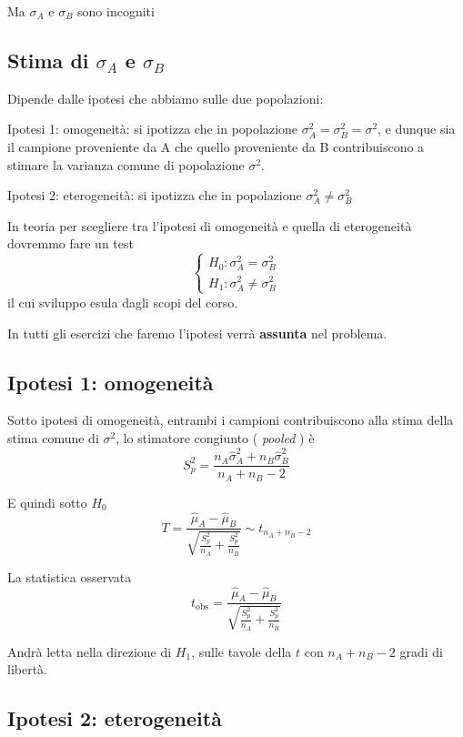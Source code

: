 \documentclass[
  11pt,
]{book}
\theoremstyle{mytheoremstyle}
\theoremstyle{mydefstyle}
\begin{document}
Ma \(\sigma_A\) e \(\sigma_B\) sono incogniti

\subsection{\texorpdfstring{Stima di \(\sigma_A\) e \(\sigma_B\)}{Stima di \textbackslash sigma\_A e \textbackslash sigma\_B}}\label{stima-di-sigma_a-e-sigma_b}

Dipende dalle ipotesi che abbiamo sulle due popolazioni:

Ipotesi 1: omogeneità: si ipotizza che in popolazione \(\sigma_A^2=\sigma_B^2=\sigma^2\), e dunque sia il campione proveniente da A che quello proveniente da B contribuiscono a stimare la varianza comune di popolazione \(\sigma^2\).

Ipotesi 2: eterogeneità: si ipotizza che in popolazione \(\sigma_A^2\neq\sigma_B^2\)

In teoria per scegliere tra l'ipotesi di omogeneità e quella di eterogeneità dovremmo fare un test
\[\begin{cases}
H_0:\sigma^2_A=\sigma^2_B\\
H_1:\sigma^2_A\neq\sigma^2_B
\end{cases}\]
il cui sviluppo esula dagli scopi del corso.

In tutti gli esercizi che faremo l'ipotesi verrà \textbf{assunta} nel problema.

\subsection{Ipotesi 1: omogeneità}\label{ipotesi-1-omogeneituxe0}

Sotto ipotesi di omogeneità, entrambi i campioni contribuiscono alla stima della stima comune di \(\sigma^2\), lo stimatore congiunto ( \emph{pooled} ) è
\[S^2_p=\frac{n_A\hat\sigma_A^2+n_B\hat\sigma_B^2}{n_A+n_B-2}\]

E quindi sotto \(H_0\)
\[T=\frac{\hat\mu_A-\hat\mu_B}{\sqrt{\frac{S_p^2}{n_A}+\frac{S_p^2}{n_B}}}\sim t_{n_A+n_B-2}\]

La statistica osservata
\[t_{\text{obs}}=\frac{\hat\mu_A-\hat\mu_B}{\sqrt{\frac{S_p^2}{n_A}+\frac{S_p^2}{n_B}}}\]

Andrà letta nella direzione di \(H_1\), sulle tavole della \(t\) con \(n_A+n_B-2\) gradi di libertà.

\subsection{Ipotesi 2: eterogeneità}\label{ipotesi-2-eterogeneituxe0}
\end{document}
